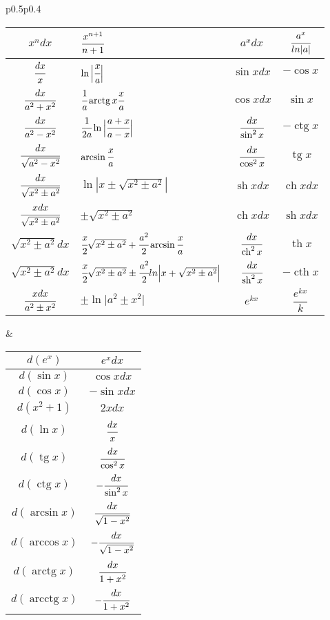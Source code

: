 

\small
\begin{tabular}{p{}p{}}
	\begin{tabular}{||c|l||c|c||}
		\hline
		$x^ndx$&$\cfrac{x^{n+1}}{n+1}$&$a^xdx$&$\cfrac{a^x}{ln|a|}$\\
		\hline
		$\cfrac{dx}{x}$&$\ln\Big|\cfrac{x}{a}\Big|$&$\sin{x}dx$&$-\cos{x}$\\
		\hline
		$\cfrac{dx}{a^2+x^2}$&$\cfrac{1}{a} \operatorname{arctg} x{\cfrac{x}{a}}$&$\cos{x}dx$&$\sin{x}$\\
		\hline
		$\cfrac{dx}{a^2-x^2}$&$\cfrac{1}{2a}\ln\Big|\cfrac{a+x}{a-x}\Big|$&$\cfrac{dx}{\sin^2x}$&$-\operatorname{ctg} x$\\
		\hline
		$\cfrac{dx}{\sqrt{a^2-x^2}}$&$\arcsin\cfrac{x}{a}$&$\cfrac{dx}{\cos^2x}$&$\operatorname{tg} x$\\
		\hline
		$\cfrac{dx}{\sqrt{x^2\pm a^2}}$&$\ln|x\pm\sqrt{x^2\pm a^2}|$&$\operatorname{sh} xdx$&$\operatorname{ch} xdx$\\
		\hline
		$\cfrac{xdx}{\sqrt{x^2\pm a^2}}$&$\pm\sqrt{x^2\pm a^2}$&$\operatorname{ch}xdx$&$\operatorname{sh}xdx$\\
		\hline
		$\sqrt{x^2\pm a^2}dx$&$\cfrac{x}{2}\sqrt{x^2\pm a^2}+\cfrac{a^2}{2}\operatorname{arcsin}\cfrac{x}{a}$&$\cfrac{dx}{\operatorname{ch}^2x}$&$\operatorname{th}x$\\
		\hline
		$\sqrt{x^2\pm a^2}dx$&$\cfrac{x}{2}\sqrt{x^2\pm a^2}\pm \cfrac{a^2}{2}ln\Big|x+\sqrt{x^2\pm a^2}\Big|$&$\cfrac{dx}{\operatorname{sh}^2x}$&$-\operatorname{cth}x$\\
		\hline
		$\cfrac{xdx}{a^2\pm x^2}$&$\pm\ln\Big|a^2\pm x^2\Big|$&$e^{kx}$&$\dfrac{e^{kx}}{k}$\\
		\hline
	\end{tabular}&
	\begin{tabular}{||c|c||}
		\hline
		$d(e^{x})$&$e^xdx$\\[5pt]
		\hline
		$d(\sin{x})$&$\cos{x}dx$\\[5pt]
		\hline
		$d(\cos{x})$&$-\sin{x}dx$\\[4pt]
		\hline
		$d(x^2+1)$&$2xdx$\\[5pt]
		\hline
		$d(\ln{x})$&$\cfrac{dx}{x}$\\[5pt]
		\hline
		$d(\operatorname{tg}{x})$&$\cfrac{dx}{\cos^2{x}}$\\ [4pt]
		\hline
		$d(\operatorname{ctg}x)$&$-\cfrac{dx}{\sin^2{x}}$\\[4pt]
		\hline
		$d(\arcsin{x})$&$\cfrac{dx}{\sqrt{1-x^2}}$\\[4pt]
		\hline
		$d(\arccos{x})$&$-\cfrac{dx}{\sqrt{1-x^2}}$\\[4pt]
		\hline
		$d(\operatorname{arctg}x)$&$\cfrac{dx}{1+x^2}$\\[4.4pt]
		\hline
		$d(\operatorname{arcctg}x)$&$-\cfrac{dx}{1+x^2}$\\
		\hline
	\end{tabular}
\end{tabular}

